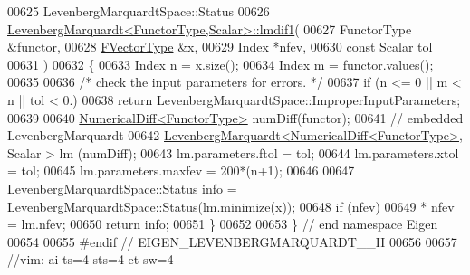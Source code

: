 \begin{DoxyCode}
00625 LevenbergMarquardtSpace::Status
00626 \hyperlink{class_eigen_1_1_levenberg_marquardt}{LevenbergMarquardt<FunctorType,Scalar>::lmdif1}(
00627         FunctorType &functor,
00628         \hyperlink{group___core___module}{FVectorType}  &x,
00629         Index *nfev,
00630         \textcolor{keyword}{const} Scalar tol
00631         )
00632 \{
00633     Index n = x.size();
00634     Index m = functor.values();
00635 
00636     \textcolor{comment}{/* check the input parameters for errors. */}
00637     \textcolor{keywordflow}{if} (n <= 0 || m < n || tol < 0.)
00638         \textcolor{keywordflow}{return} LevenbergMarquardtSpace::ImproperInputParameters;
00639 
00640     \hyperlink{class_eigen_1_1_numerical_diff}{NumericalDiff<FunctorType>} numDiff(functor);
00641     \textcolor{comment}{// embedded LevenbergMarquardt}
00642     \hyperlink{class_eigen_1_1_levenberg_marquardt}{LevenbergMarquardt<NumericalDiff<FunctorType>}, Scalar > lm
      (numDiff);
00643     lm.parameters.ftol = tol;
00644     lm.parameters.xtol = tol;
00645     lm.parameters.maxfev = 200*(n+1);
00646 
00647     LevenbergMarquardtSpace::Status info = LevenbergMarquardtSpace::Status(lm.minimize(x));
00648     \textcolor{keywordflow}{if} (nfev)
00649         * nfev = lm.nfev;
00650     \textcolor{keywordflow}{return} info;
00651 \}
00652 
00653 \} \textcolor{comment}{// end namespace Eigen}
00654 
00655 \textcolor{preprocessor}{#endif // EIGEN\_LEVENBERGMARQUARDT\_\_H}
00656 
00657 \textcolor{comment}{//vim: ai ts=4 sts=4 et sw=4}
\end{DoxyCode}
